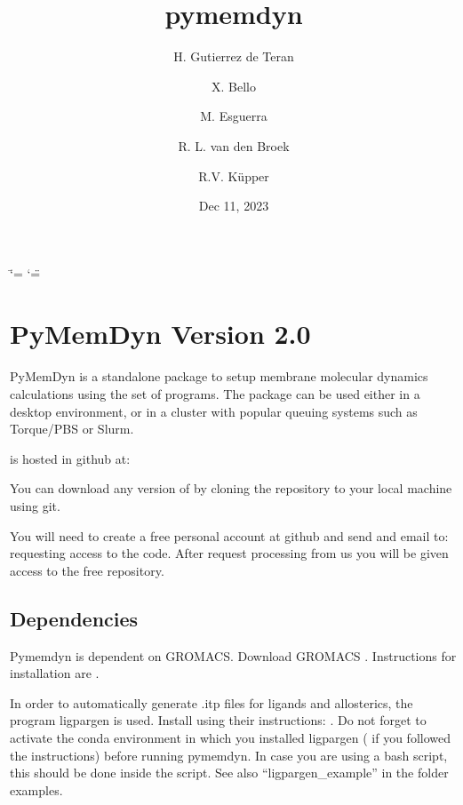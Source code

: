 \documentclass[letterpaper,10pt,english]{sphinxmanual}
\title{pymemdyn}
\date{Dec 11, 2023}
\author{H. Gutierrez de Teran \and X. Bello \and M. Esguerra \and R. L. van den Broek \and R.V. Küpper}
\begin{document}
\ifdefined\shorthandoff
  \ifnum\catcode`\=\string=\active\shorthandoff{=}\fi
  \ifnum\catcode`\"=\active{}\fi
\fi

\pagestyle{empty}
\sphinxmaketitle
\pagestyle{plain}
\sphinxtableofcontents
\pagestyle{normal}
\label{\detokenize{index::doc}}


\sphinxstepscope


\chapter{PyMemDyn Version 2.0}
\label{\detokenize{installation:pymemdyn-version-2-0}}\label{\detokenize{installation::doc}}
\sphinxAtStartPar
PyMemDyn is a standalone  package to setup membrane molecular
dynamics calculations using the  set of programs. The package
can be used either in a desktop environment, or in a cluster with
popular queuing systems such as Torque/PBS or Slurm.

\sphinxAtStartPar
{} is hosted in github at:

\sphinxAtStartPar
{}

\sphinxAtStartPar
You can download any version of  by cloning the repository
to your local machine using git.

\sphinxAtStartPar
You will need to create a free personal account at github and send and
e\sphinxhyphen{}mail to:  requesting access to the code. After
request processing from us you will be given access to the free
repository.


\section{Dependencies}
\label{\detokenize{installation:dependencies}}
\begin{DUlineblock}{0em}
\item[] 
\item[] Pymemdyn is dependent on GROMACS. Download GROMACS
.
Instructions for installation are
.
\end{DUlineblock}

\begin{DUlineblock}{0em}
\item[] 
\item[] In order to automatically generate .itp files for ligands and
allosterics, the program ligpargen is used. Install using their
instructions: . Do not forget to
activate the conda environment in which you installed ligpargen
( if you followed the instructions) before
running pymemdyn. In case you are using a bash script, this should be
done inside the script. See also “ligpargen\_example” in the folder
examples.
\end{DUlineblock}
\end{document}
